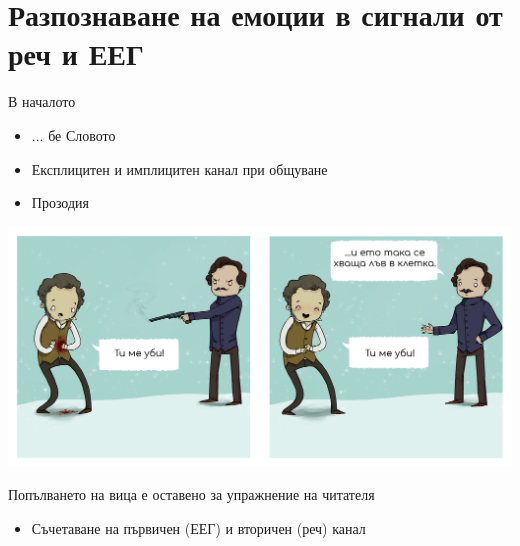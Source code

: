 \documentclass[9pt]{beamer}
\begin{document}
    \section{Разпознаване на емоции в сигнали от реч и ЕЕГ}
    \begin{frame}{В началото}
        \begin{itemize}
            \item ... бе Словото
            \pause 
            \item Експлицитен и имплицитен канал при общуване
            \pause 
            \item Прозодия
        \end{itemize}
        \pause 
        \begin{center}
            \includegraphics[width=\textwidth]{meaning.png}%

            \footnotesize{Попълването на вица е оставено за упражнение на читателя}
            \normalsize
        \end{center}
        \pause
        \begin{itemize}
            \item Съчетаване на първичен (ЕЕГ) и вторичен (реч) канал
        \end{itemize}        
    \end{frame}
    
\end{document}

